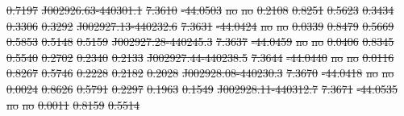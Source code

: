 \documentclass[11pt, a4paper]{book}
\providecommand{\DIFdeltex}[1]{{\protect\color{red}\sout{#1}}}                      %
\providecommand{\DIFdel}[1]{\texorpdfstring{\DIFdeltex{#1}}{}} %
\begin{document}
\DIFdel{0.7197}%
\DIFdel{J002926.63-440301.1 }%
\DIFdel{7.3610 }%
\DIFdel{-44.0503 }%
\DIFdel{no }%
\DIFdel{no }%
\DIFdel{0.2108 }%
\DIFdel{0.8251 }%
\DIFdel{0.5623 }%
\DIFdel{0.3434 }%
\DIFdel{0.3306 }%
\DIFdel{0.3292}%
\DIFdel{J002927.13-440232.6 }%
\DIFdel{7.3631 }%
\DIFdel{-44.0424 }%
\DIFdel{no }%
\DIFdel{no }%
\DIFdel{0.0339 }%
\DIFdel{0.8479 }%
\DIFdel{0.5669 }%
\DIFdel{0.5853 }%
\DIFdel{0.5148 }%
\DIFdel{0.5159}%
\DIFdel{J002927.28-440245.3 }%
\DIFdel{7.3637 }%
\DIFdel{-44.0459 }%
\DIFdel{no }%
\DIFdel{no }%
\DIFdel{0.0406 }%
\DIFdel{0.8345 }%
\DIFdel{0.5540 }%
\DIFdel{0.2702 }%
\DIFdel{0.2340 }%
\DIFdel{0.2133}%
\DIFdel{J002927.44-440238.5 }%
\DIFdel{7.3644 }%
\DIFdel{-44.0440 }%
\DIFdel{no }%
\DIFdel{no }%
\DIFdel{0.0116 }%
\DIFdel{0.8267 }%
\DIFdel{0.5746 }%
\DIFdel{0.2228 }%
\DIFdel{0.2182 }%
\DIFdel{0.2028}%
\DIFdel{J002928.08-440230.3 }%
\DIFdel{7.3670 }%
\DIFdel{-44.0418 }%
\DIFdel{no }%
\DIFdel{no }%
\DIFdel{0.0024 }%
\DIFdel{0.8626 }%
\DIFdel{0.5791 }%
\DIFdel{0.2297 }%
\DIFdel{0.1963 }%
\DIFdel{0.1549}%
\DIFdel{J002928.11-440312.7 }%
\DIFdel{7.3671 }%
\DIFdel{-44.0535 }%
\DIFdel{no }%
\DIFdel{no }%
\DIFdel{0.0011 }%
\DIFdel{0.8159 }%
\DIFdel{0.5514 }%
\end{document}
